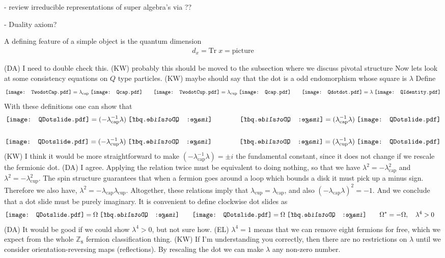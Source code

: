 \documentclass[12pt,a4paper]{article}
\newcommand{\zz}{\mathbb{Z}}
\newcommand{\dave}[1]{{\color{ao(english)}\footnotesize{(DA) #1}}}
\newcommand{\ethan}[1]{{\color{amethyst}\footnotesize{(EL) #1}}}
\newcommand{\kw}[1]{{\color{kwcolor}\footnotesize{(KW) #1}}}
\newcommand{\Qcap}{\mathord{\vcenter{\hbox{\texttt{[image: Qcap.pdf]}}}}}
\newcommand{\Qcup}{\mathord{\vcenter{\hbox{\texttt{[image: Qcap.pdf]}}}}}
\newcommand{\Qdotdot}{\mathord{\vcenter{\hbox{\texttt{[image: Qdotdot.pdf]}}}}}
\newcommand{\QIdentity}{\mathord{\vcenter{\hbox{\texttt{[image: QIdentity.pdf]}}}}}
\newcommand{\QCapDotL}{\mathord{\vcenter{\hbox{\texttt{[image: QDotslide.pdf]}}}}}
\newcommand{\QCupDotR}{\mathord{\vcenter{\hbox{\texttt{[image: QDotslide.pdf]}}}}}
\newcommand{\QCapDotR}{\mathord{\vcenter{\hbox{\reflectbox{\texttt{[image: QDotslide.pdf]}}}}}}
\newcommand{\QCupDotL}{\mathord{\vcenter{\hbox{\reflectbox{\texttt{[image: QDotslide.pdf]}}}}}}
\newcommand{\TwodotCap}{\mathord{\vcenter{\hbox{\texttt{[image: TwodotCap.pdf]}}}}}
\newcommand{\TwodotCup}{\mathord{\vcenter{\hbox{\texttt{[image: TwodotCup.pdf]}}}}}
\begin{document}
$$
$$
- review irreducible representations of super algebra's via \cite{jozefiak1988}??

- Duality axiom?
$$
$$



A defining feature of a simple object is the quantum dimension
\begin{align}
d_x = \text{Tr} \; x = \text{picture}
\end{align}

\dave{I need to double check this.}
\kw{probably this should be moved to the subsection where we discuss pivotal structure}
Now lets look at some consistency equations on $Q$ type particles.
\kw{maybe should say that the dot is a odd endomorphism whose square is $\lambda$}
Define 
\begin{align}
\TwodotCap =  \lambda_{\text{cap}} \; \Qcap \quad \quad
\TwodotCup =  \lambda_{\text{cup}}\; \Qcup \quad \quad
\Qdotdot =  \lambda \; \QIdentity
\end{align}
With these definitions one can show that
\begin{align}
\QCapDotL =(-\lambda_{\text{cap}}^{-1} \lambda )\; \QCapDotR \qquad \qquad \QCapDotR  = (\lambda_{\text{cap}}^{-1} \lambda ) \; \QCapDotL\\ 
\\
\QCupDotR= (-\lambda_{\text{cup}}^{-1} \lambda )\; \QCupDotL \qquad \qquad \QCupDotL  = (\lambda_{\text{cup}}^{-1} \lambda) \; \QCupDotR
\end{align}
\kw{I think it would be more straightforward to make $(-\lambda_{\text{cap}}^{-1} \lambda ) = \pm i$ the fundamental constant,
since it does not change if we rescale the fermionic dot.}
\dave{I agree.}
Applying the relation twice must be equivalent to doing nothing, so that we have $\lambda^2 = -\lambda_{\text{cap}}^2$ and $\lambda^2 = -\lambda_{\text{cup}}^2$.
The spin structure guarantees that when a fermion goes around a loop which bounds a disk it must pick up a minus sign. 
Therefore we also have, $\lambda^2 = -\lambda_{\text{cap}} \lambda_{\text{cup}}$.
Altogether, these relations imply that $\lambda_{\text{cup}} = \lambda_{\text{cap}}$, and also $(-\lambda_{\text{cap}} \lambda)^2 = -1$.
And we conclude that a dot slide must be purely imaginary. It is convenient to define clockwise dot slides as
\begin{align}
&\QCapDotL =\Omega \; \QCapDotR \quad \quad \QCupDotR= \Omega \; \QCupDotL \quad \quad \Omega^* = -\Omega, \quad \lambda^4 >0
\end{align}
\dave{It would be good if we could show $\lambda^4>0$, but not sure how.} \ethan{$\lambda^4=1$ means that we can remove eight fermions for free, which we expect from the whole $\zz_8$ fermion classification thing.}
\kw{If I'm understanding you correctly, then there are no restrictions on $\lambda$ until we consider orientation-reversing maps (reflections).
By rescaling the dot we can make $\lambda$ any non-zero number.}
\end{document}

